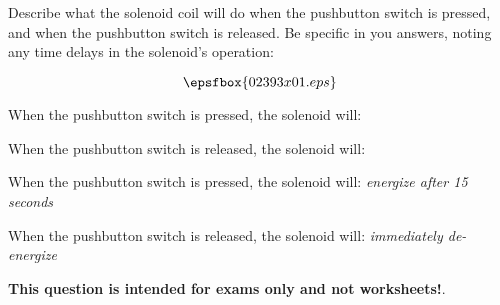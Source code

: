 

Describe what the solenoid coil will do when the pushbutton switch is pressed, and when the pushbutton switch is released.  Be specific in you answers, noting any time delays in the solenoid's operation:

$$\epsfbox{02393x01.eps}$$

When the pushbutton switch is pressed, the solenoid will:

\vskip 20pt

When the pushbutton switch is released, the solenoid will:







When the pushbutton switch is pressed, the solenoid will: {\it energize after 15 seconds}

\vskip 10pt

When the pushbutton switch is released, the solenoid will: {\it immediately de-energize}







{\bf This question is intended for exams only and not worksheets!}.




